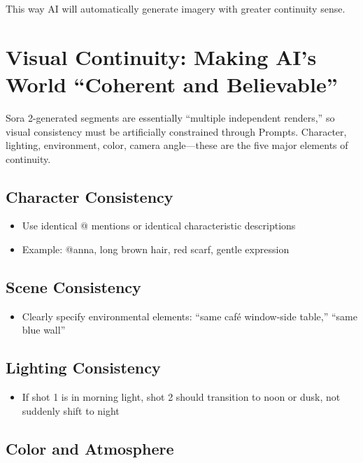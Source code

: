 This way AI will automatically generate imagery with greater continuity sense.

\section{Visual Continuity: Making AI's World ``Coherent and Believable''}
\label{sec:visual-continuity}

Sora 2-generated segments are essentially ``multiple independent renders,'' so visual consistency must be artificially constrained through Prompts. Character, lighting, environment, color, camera angle—these are the five major elements of continuity.

\subsection{Character Consistency}

\begin{itemize}
\item Use identical @ mentions or identical characteristic descriptions
\item Example: @anna, long brown hair, red scarf, gentle expression
\end{itemize}

\subsection{Scene Consistency}

\begin{itemize}
\item Clearly specify environmental elements: ``same café window-side table,'' ``same blue wall''
\end{itemize}

\subsection{Lighting Consistency}

\begin{itemize}
\item If shot 1 is in morning light, shot 2 should transition to noon or dusk, not suddenly shift to night
\end{itemize}

\subsection{Color and Atmosphere}

